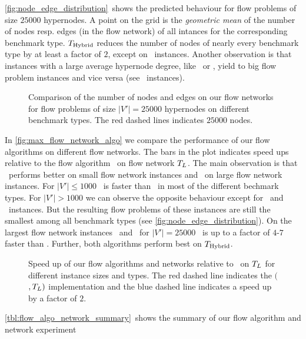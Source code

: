 \autoref{fig:node_edge_distribution}~shows the predicted behaviour for flow problems of size
$25000$ hypernodes. A point on the grid is the \emph{geometric mean} of the number of 
nodes resp. edges (in the flow network) of all intances for the corresponding benchmark type.
$T_{\text{Hybrid}}$ reduces the number of nodes of nearly every benchmark type by at least a factor
of $2$, except on \SPM~instances. Another observation is that instances with a large average 
hypernode degree, like \Primal~or \Literal, yield to big flow problem instances and vice 
versa (see \Dual~instances).\\
\begin{figure}
\centering
\caption{Comparison of the number of nodes and edges on our flow networks for 
         flow problems of size $|V'| = 25000$ hypernodes on different benchmark types.
         The red dashed lines indicates $25000$ nodes.}
\label{fig:node_edge_distribution}
\end{figure} 
In \autoref{fig:max_flow_network_algo} we compare the performance of our flow algorithms on
different flow networks. The bars in the plot indicates speed ups relative to the flow algorithm
\EdmondKarp~on flow network $T_L$. The main observation is that \EdmondKarp~performs
better on small flow network instances and \GoldbergTarjan~on large flow network instances. For $|V'| \le 1000$
\EdmondKarp~is faster than \GoldbergTarjan~in most of the different bechmark types. For
$|V'| > 1000$ we can observe the opposite behaviour except for \DAC~and \Dual~instances. But the
resulting flow problems of these instances are still the smallest among all benchmark types
(see \autoref{fig:node_edge_distribution}). On the largest flow network instances \Primal~and
\Literal~for $|V'| = 25000$ \GoldbergTarjan~is up to a factor of $4$-$7$ faster than \EdmondKarp.
Further, both algorithms perform best on $T_{\text{Hybrid}}$.
\begin{figure}
\centering
\caption{Speed up of our flow algorithms and networks relative to \EdmondKarp~on
         $T_L$ for different instance sizes and types. The red dashed line indicates the
         $($\EdmondKarp$,T_L)$ implementation and the blue dashed line
         indicates a speed up by a factor of $2$.}
\label{fig:max_flow_network_algo}
\end{figure} 
\autoref{tbl:flow_algo_network_summary}~shows the summary of our flow algorithm and network experiment
